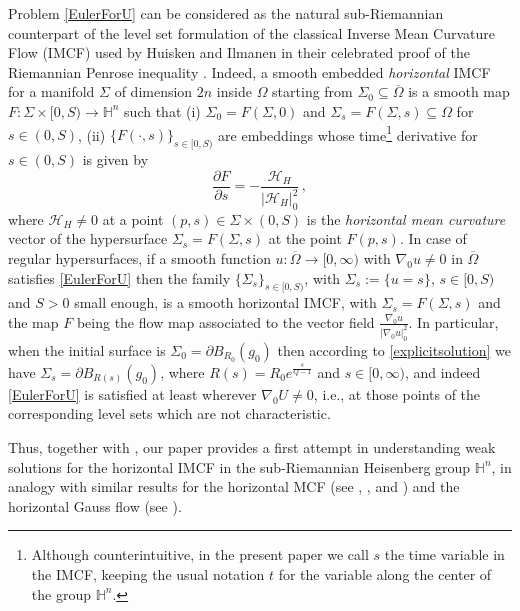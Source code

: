 \documentclass[10pt]{amsart}
\numberwithin{equation}{section}
\theoremstyle{definition}
\newcommand{\He}{\mathbb{H}}
\begin{document}
Problem \eqref{EulerForU} can be considered as the natural sub-Riemannian counterpart of
the level set formulation of the classical Inverse Mean Curvature Flow (IMCF)
used by Huisken and Ilmanen in their celebrated proof of the Riemannian Penrose inequality \cite{HuiskenIlmanen}. Indeed, a smooth embedded {\em horizontal} IMCF for a manifold $\Sigma$ of dimension $2n$ inside $\Omega$ starting from $\Sigma_0\subseteq \overline{\Omega}$ is a smooth map $F: \Sigma\times [0,S) \to \He^n$ such that (i) $\Sigma_0=F(\Sigma,0)$ and $\Sigma_s=F(\Sigma, s) \subseteq \Omega$ for $s \in (0,S)$,  (ii) $\{F(\cdot,s)\}_{s \in [0,S)}$ are embeddings whose time\footnote{Although counterintuitive, in the present paper we call $s$ the time variable in the IMCF, keeping the usual notation $t$ for the variable along the center of the group $\He^n$.} derivative for $s \in (0,S)$ is given by 
\[ \frac{\partial F}{\partial s}=-\frac{\mathcal{H}_H}{|\mathcal{H}_H|_0^2} \, ,\]
where $\mathcal{H}_H\neq 0$ at a point $(p,s) \in \Sigma \times (0,S)$ is the {\em horizontal mean curvature} vector of the hypersurface $\Sigma_s=F(\Sigma,s)$ at the point $F(p,s)$. In case of regular hypersurfaces, if a smooth function $u: \overline{\Omega} \to [0,\infty)$ with $\nabla_0 u \neq 0$ in $\overline{\Omega}$ satisfies \eqref{EulerForU} then the family  $\{\Sigma_s\}_{s \in [0,S)}$, with $\Sigma_s:=\{u =s\} $, $s \in [0,S)$ and $S>0$ small enough, is a smooth horizontal IMCF, with $\Sigma_s=F(\Sigma, s)$ and the map $F$ being the flow map associated to the vector field $\frac{\nabla_0 u}{|\nabla_0 u|_0^2}$. In particular, when the initial surface is $\Sigma_0=\partial B_{R_0}(g_0)$ then according to \eqref{explicitsolution} we have $\Sigma_s=\partial B_{R(s)}(g_0)$, where $\displaystyle{R(s)=R_0 e^\frac{s}{Q-1}}$ and $s \in [0,\infty)$, and indeed \eqref{EulerForU} is satisfied at least wherever $\nabla_0 U \neq 0$, i.e., at those points of the corresponding level sets which are not characteristic.

Thus, together with \cite{CuiZhao}, our paper provides a first attempt in understanding weak solutions for the horizontal IMCF in the sub-Riemannian Heisenberg group $\mathbb{H}^n$, in analogy with similar results for the horizontal MCF  (see \cite{CapoCitti}, \cite{CapoCitti2}, \cite{Ferrari} and \cite{Dirdravon}) and the horizontal Gauss flow  (see \cite{Haller}). 
\end{document}
